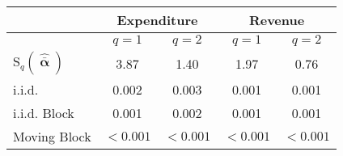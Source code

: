 \begin{tabular}{@{}lcccc@{}}
	\toprule 
	& \multicolumn{2}{c}{ Expenditure } & \multicolumn{2}{c}{ Revenue } \\
	\hline
	& $q=1$ & $q=2$ & $q=1$ & $q=2$ \vspace{2mm}\\
	$\text{S}_q (\boldsymbol{\hat{\bar{\upalpha}}})$ & 3.87 & 1.40 & 1.97 & 0.76\vspace{2mm}\\
	i.i.d. & 0.002 & 0.003 & 0.001 & 0.001\\
	i.i.d. Block & 0.001 & 0.002 & 0.001 & 0.001\\
	Moving Block & $<0.001$ & $<0.001$ & $<0.001$ & $<0.001$ \\
	\bottomrule
\end{tabular}
